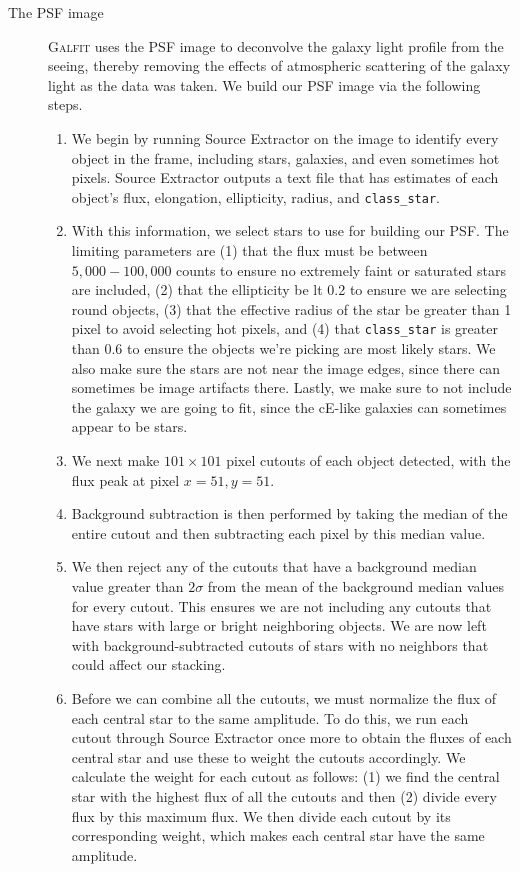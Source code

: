 \documentclass[iop,apj]{emulateapj}
\begin{document}
\begin{description}
\item[The PSF image]{\textsc{Galfit} uses the PSF image to deconvolve the galaxy light profile from the seeing, thereby removing the effects of atmospheric scattering of the galaxy light as the data was taken. We build our PSF image via the following steps.
\begin{enumerate}

\item We begin by running Source Extractor on the image to identify every object in the frame, including stars, galaxies, and even sometimes hot pixels. Source Extractor outputs a text file that has estimates of each object's flux, elongation, ellipticity, radius, and \texttt{class\_star}.

\item With this information, we select stars to use for building our PSF. The limiting parameters are (1) that the flux must be between $5,000-100,000$ counts to ensure no extremely faint or saturated stars are included, (2) that the ellipticity be lt 0.2 to ensure we are selecting round objects, (3) that the effective radius of the star be greater than 1 pixel to avoid selecting hot pixels, and (4) that \texttt{class\_star} is greater than 0.6 to ensure the objects we're picking are most likely stars. We also make sure the stars are not near the image edges, since there can sometimes be image artifacts there. Lastly, we make sure to not include the galaxy we are going to fit, since the cE-like galaxies can sometimes appear to be stars.

\item We next make $101\times101$ pixel cutouts of each object detected, with the flux peak at pixel $x=51,y=51$. 

\item Background subtraction is then performed by taking the median of the entire cutout and then subtracting each pixel by this median value.

\item We then reject any of the cutouts that have a background median value greater than $2\sigma$ from the mean of the background median values for every cutout. This ensures we are not including any cutouts that have stars with large or bright neighboring objects. We are now left with background-subtracted cutouts of stars with no neighbors that could affect our stacking. 

\item Before we can combine all the cutouts, we must normalize the flux of each central star to the same amplitude. To do this, we run each cutout through Source Extractor once more to obtain the fluxes of each central star and use these to weight the cutouts accordingly. We calculate the weight for each cutout as follows: (1) we find the central star with the highest flux of all the cutouts and then (2) divide every flux by this maximum flux. We then divide each cutout by its corresponding weight, which makes each central star have the same amplitude.


\end{enumerate}}
\end{description}
\end{document}
